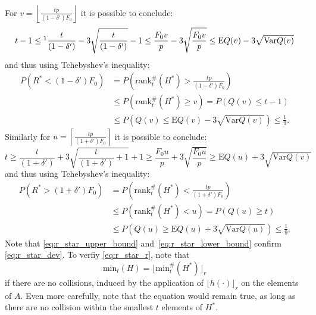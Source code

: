 \documentclass[11pt,a4paper]{article}
\newcommand{\var}{\mathrm{Var}}
\newcommand{\expectation}{\mathrm{E}}
\begin{document}
\noindent For $v = \left\lfloor \frac{tp}{(1-\delta') F_0} \right\rfloor$ it is possible to conclude:
\begin{equation*}
    t-1 \leq\footnotemark \frac{t}{(1-\delta')} - 3\sqrt{\frac{t}{(1-\delta')}} - 1 
     \leq  \frac{F_0 v}{p} - 3 \sqrt{\frac{F_0 v}{p}} \leq \expectation Q(v) - 3 \sqrt{\var Q(v)}
\end{equation*}
and thus using Tchebyshev's inequality:
\begin{align}
    P\left(R^* < \left(1-\delta'\right) F_0\right) & = P\left(\mathrm{rank}_t^{\#}(H^*) > \frac{tp}{(1-\delta')F_0}\right) \nonumber \\ 
    & \leq P(\mathrm{rank}_t^{\#}(H^*) \geq v) = P(Q(v) \leq t-1) \label{eq:r_star_upper_bound} \\
    & \leq P\left(Q(v) \leq \expectation Q(v) - 3 \sqrt{\var Q(v)}\right) \leq \frac{1}{9} \textrm{.} \nonumber
\end{align}
Similarly for $u = \left\lceil \frac{tp}{(1+\delta') F_0} \right\rceil$ it is possible to conclude:
\begin{equation*}
    t \geq  \frac{t}{(1+\delta')} + 3\sqrt{\frac{t}{(1+\delta')}+1} + 1 
     \geq  \frac{F_0 u}{p} + 3 \sqrt{\frac{F_0 u}{p}} \geq \expectation Q(u) + 3 \sqrt{\var Q(v)}
\end{equation*}
and thus using Tchebyshev's inequality:
\begin{align}
    P\left(R^* > \left(1+\delta'\right) F_0\right) & = P\left(\mathrm{rank}_t^{\#}(H^*) < \frac{tp}{(1+\delta')F_0}\right) \nonumber \\ 
    & \leq P(\mathrm{rank}_t^{\#}(H^*) < u) = P(Q(u) \geq t) \label{eq:r_star_lower_bound} \\
    & \leq P\left(Q(u) \geq \expectation Q(u) + 3 \sqrt{\var Q(u)}\right) \leq \frac{1}{9} \textrm{.} \nonumber
\end{align}
Note that \autoref{eq:r_star_upper_bound} and~\ref{eq:r_star_lower_bound} confirm \autoref{eq:r_star_dev}. To verfiy \autoref{eq:r_star_r}, note that
\begin{equation}
    \label{eq:rank_eq}
    \mathrm{min}_t(H) = \lfloor \mathrm{min}_t^{\#}(H^*) \rfloor_r
\end{equation}
if there are no collisions, induced by the application of $\lfloor h(\cdot) \rfloor_r$ on the elements of $A$.
Even more carefully, note that the equation would remain true, as long as there are no collision within the smallest $t$ elements of $H^*$.
\end{document}
